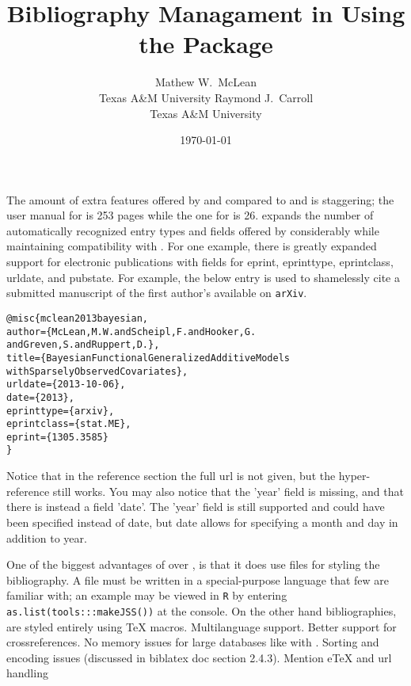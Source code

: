 \documentclass[article]{jss}\usepackage[]{graphicx}\usepackage[]{color}
\title{\Biblatex{} Bibliography Managament in \R{} Using the \ourpkg{} Package}
\author{Mathew W.\ McLean\\ Texas A\&M University
\And
Raymond J.\ Carroll\\
Texas A\&M University
}
\date{\today}
\makeatletter
\newenvironment{kframe}{%
 \def\at@end@of@kframe{}%
 \ifinner\ifhmode%
  \def\at@end@of@kframe{\end{minipage}}%
  \begin{minipage}{\columnwidth}%
 \fi\fi%
 \def\FrameCommand##1{\hskip\@totalleftmargin \hskip-\fboxsep
 \colorbox{shadecolor}{##1}\hskip-\fboxsep
     \hskip-\linewidth \hskip-\@totalleftmargin \hskip\columnwidth}%
 \MakeFramed {\advance\hsize-\width
   \@totalleftmargin\z@ \linewidth\hsize
   \@setminipage}}%
 {\par\unskip\endMakeFramed%
 \at@end@of@kframe}
\newenvironment{knitrout}{}{} %
\makeatother
\begin{document}
\maketitle

The amount of extra features offered by \Biblatex{} and \biber{} compared to \natbib{} and \Bibtex{} is staggering; the user manual for \Biblatex{} is 253 pages while the one for \natbib{} is 26.  \Biblatex{} expands the number of automatically recognized entry types and fields offered by \Bibtex{} considerably while maintaining compatibility with \Bibtex{}.  For one example, there is greatly expanded support for electronic publications with fields for eprint, eprinttype, eprintclass, urldate, and pubstate.  For example, the below entry is used to shamelessly cite a submitted manuscript of the first author's available on \texttt{arXiv}. 

\begin{knitrout}
\color{fgcolor}\begin{kframe}
\begin{alltt}
@misc\{mclean2013bayesian,
  author = \{McLean, M. W. and Scheipl, F. and Hooker, G.
                and Greven, S. and Ruppert, D.\},
  title = \{Bayesian Functional Generalized Additive Models 
                with Sparsely Observed Covariates\},
  urldate = \{2013-10-06\},
  date = \{2013\},
  eprinttype = \{arxiv\},
  eprintclass = \{stat.ME\},
  eprint = \{1305.3585\}
\}
\end{alltt}
\end{kframe}
\end{knitrout}

Notice that in the reference section the full url is not given, but the hyper-reference still works.  You may also notice that the 'year' field is missing, and that there is instead a field 'date'.  The 'year' field is still supported and could have been specified instead of date, but date allows for specifying a month and day in addition to year.

One of the biggest advantages of \Biblatex{} over \Bibtex{}, is that it does use \bst{} files for styling the bibliography. A \bst{} file must be written in a special-purpose language that few are familiar with; an example may be viewed in \texttt{R} by entering \texttt{as.list(tools:::makeJSS())} at the console.  On the other hand \Biblatex{} bibliographies, are styled entirely using \TeX{} macros.  Multilanguage support.  Better support for crossreferences.  No memory issues for large databases like with \Bibtex{}.  Sorting and encoding issues (discussed in biblatex doc section 2.4.3). Mention eTeX and url handling
\end{document}

